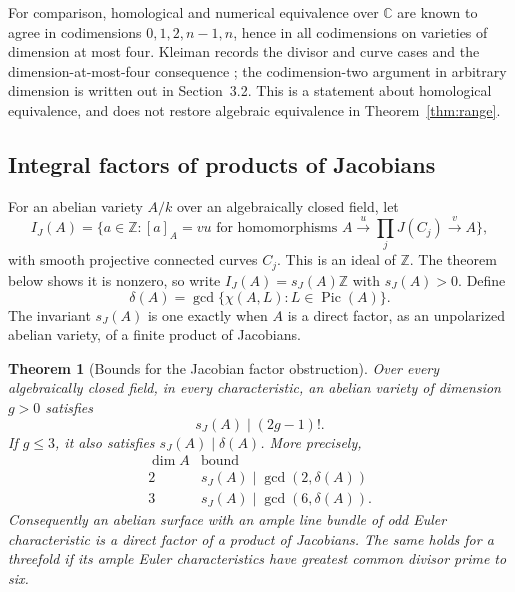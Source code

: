 \documentclass[11pt]{article}
\newcommand{\Pic}{\operatorname{Pic}}
\newcommand{\Z}{\mathbb Z}
\newcommand{\C}{\mathbb C}
\newtheorem{theorem}{Theorem}[section]
\theoremstyle{definition}
\theoremstyle{remark}
\begin{document}
For comparison, homological and numerical equivalence over $\C$ are known to agree in codimensions $0,1,2,n-1,n$, hence in all codimensions on varieties of dimension at most four. Kleiman records the divisor and curve cases and the dimension-at-most-four consequence \cite[Remarks~3.4 and~3.10, pp.~379--380]{Kleiman}; the codimension-two argument in arbitrary dimension is written out in Section~3.2. This is a statement about homological equivalence, and does not restore algebraic equivalence in Theorem~\ref{thm:range}.

\subsection{Integral factors of products of Jacobians}

For an abelian variety $A/k$ over an algebraically closed field, let
\[
 I_J(A)=\{a\in\Z:[a]_A=vu\text{ for homomorphisms }
 A\xrightarrow{u}\prod_jJ(C_j)\xrightarrow{v}A\},
\]
with smooth projective connected curves $C_j$. This is an ideal of $\Z$. The theorem below shows it is nonzero, so write $I_J(A)=s_J(A)\Z$ with $s_J(A)>0$. Define
\[
                    \delta(A)=\gcd\{\chi(A,L):L\in\Pic(A)\}.
\]
The invariant $s_J(A)$ is one exactly when $A$ is a direct factor, as an unpolarized abelian variety, of a finite product of Jacobians.

\begin{theorem}[Bounds for the Jacobian factor obstruction]\label{thm:scalar}
Over every algebraically closed field, in every characteristic, an abelian variety of dimension $g>0$ satisfies
\[
                     s_J(A)\mid(2g-1)!.
\]
If $g\leq3$, it also satisfies $s_J(A)\mid\delta(A)$. More precisely,
\[
 \begin{array}{c|c}
  \dim A&\text{bound}\\\hline
  2&s_J(A)\mid\gcd(2,\delta(A))\\
  3&s_J(A)\mid\gcd(6,\delta(A)).
 \end{array}
\]
Consequently an abelian surface with an ample line bundle of odd Euler characteristic is a direct factor of a product of Jacobians. The same holds for a threefold if its ample Euler characteristics have greatest common divisor prime to six.
\end{theorem}
\end{document}

